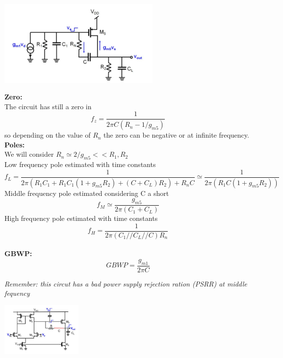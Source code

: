\centering
\includegraphics[width=0.6\textwidth]{R_n.png}\\
\raggedright


{\bf Zero:}\\
The circuit has still a zero in 
\begin{equation}
f_z=\frac{1}{2\pi C(R_n-1/g_{m5})}
\end{equation}
so depending on the value of $R_n$ the zero can be negative or at infinite frequency.\\


{\bf Poles:}\\
We will consider $R_n\simeq2/g_{m5}<<R_1,R_2$\\
Low frequency pole estimated with time constants
\begin{equation}
f_L=\frac{1}{2\pi(R_1C_1+R_1C_1(1+g_{m5}R_2)+(C+C_L)R_2)+R_nC}\simeq \frac{1}{2\pi(R_1C(1+g_{m5}R_2))}
\end{equation}
Middle frequency pole estimated considering C a short
\begin{equation}
f_{M}\simeq \frac{g_{m5}}{2\pi(C_1+C_L)}
\end{equation}
High frequency pole estimated with time constants
\begin{equation}
f_H=\frac{1}{2\pi(C_1//C_L//C)R_n}
\end{equation}
\\
{\bf GBWP:}
\begin{equation}
GBWP=\frac{g_{m1}}{2\pi C}
\end{equation}

{\it Remember: this circut has a bad power supply rejection ration (PSRR) at middle fequency}

\centering
\includegraphics[width=0.3\textwidth]{R_nPSRR.png}\\
\raggedright



